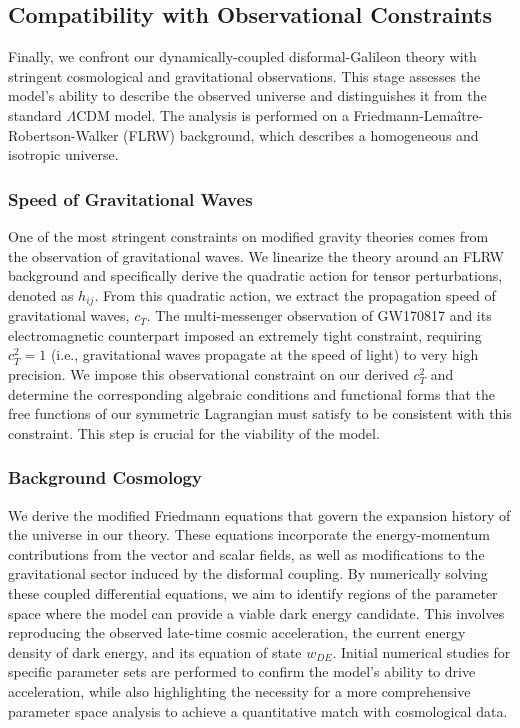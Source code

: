 \documentclass[twocolumn]{aastex631}
\begin{document}
\begin{itemize}
\subsection{Compatibility with Observational Constraints}

Finally, we confront our dynamically-coupled disformal-Galileon theory with stringent cosmological and gravitational observations. This stage assesses the model's ability to describe the observed universe and distinguishes it from the standard $\Lambda$CDM model. The analysis is performed on a Friedmann-Lemaître-Robertson-Walker (FLRW) background, which describes a homogeneous and isotropic universe.

\subsubsection{Speed of Gravitational Waves}
One of the most stringent constraints on modified gravity theories comes from the observation of gravitational waves. We linearize the theory around an FLRW background and specifically derive the quadratic action for tensor perturbations, denoted as $h_{ij}$. From this quadratic action, we extract the propagation speed of gravitational waves, $c_T$. The multi-messenger observation of GW170817 and its electromagnetic counterpart imposed an extremely tight constraint, requiring $c_T^2=1$ (i.e., gravitational waves propagate at the speed of light) to very high precision. We impose this observational constraint on our derived $c_T^2$ and determine the corresponding algebraic conditions and functional forms that the free functions of our symmetric Lagrangian must satisfy to be consistent with this constraint. This step is crucial for the viability of the model.

\subsubsection{Background Cosmology}
We derive the modified Friedmann equations that govern the expansion history of the universe in our theory. These equations incorporate the energy-momentum contributions from the vector and scalar fields, as well as modifications to the gravitational sector induced by the disformal coupling. By numerically solving these coupled differential equations, we aim to identify regions of the parameter space where the model can provide a viable dark energy candidate. This involves reproducing the observed late-time cosmic acceleration, the current energy density of dark energy, and its equation of state $w_{DE}$. Initial numerical studies for specific parameter sets are performed to confirm the model's ability to drive acceleration, while also highlighting the necessity for a more comprehensive parameter space analysis to achieve a quantitative match with cosmological data.


\end{itemize}
\end{document}
